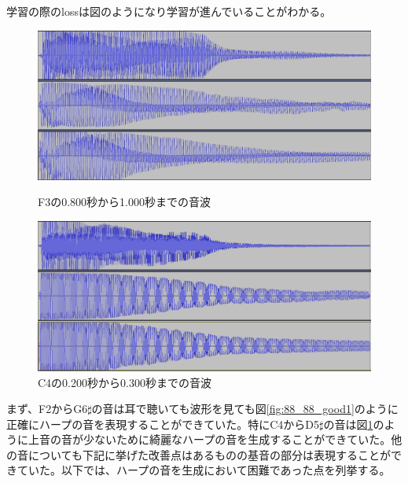 学習の際のlossは図のようになり学習が進んでいることがわかる。



\begin{figure}[t]
\begin{center}
\begin{minipage}{0.48\hsize}
\begin{center}
\includegraphics[width=0.9\hsize]{figure/88_88/f3.png}
\caption{F3の0.800秒から1.000秒までの音波}
\label{fig:88_88_good1}
\end{center}
\end{minipage}
\begin{minipage}{0.48\hsize}
\begin{center}
\includegraphics[width=0.9\hsize]{figure/88_88/c4.png}
\caption{C4の0.200秒から0.300秒までの音波}
\label{fig:88_88_good2}
\end{center}
\end{minipage}
\end{center}
\end{figure}


まず、F2からG6$\sharp$の音は耳で聴いても波形を見ても図\ref{fig:88_88_good1}のように正確にハープの音を表現することができていた。特にC4からD5$\sharp$の音は図\ref{fig:88_88_good2}のように上音の音が少ないために綺麗なハープの音を生成することができていた。他の音についても下記に挙げた改善点はあるものの基音の部分は表現することができていた。以下では、ハープの音を生成において困難であった点を列挙する。


